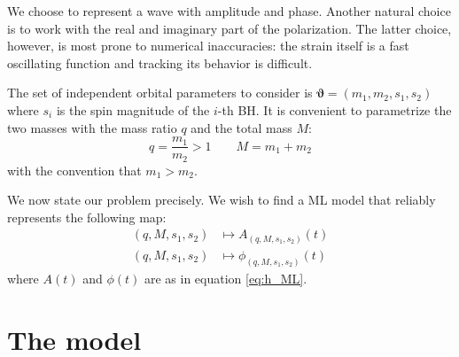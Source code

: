 \par
We choose to represent a wave with amplitude and phase. Another natural choice is to work with the real and imaginary part of the polarization. The latter choice, however, is most prone to numerical inaccuracies: the strain itself is a fast oscillating function and tracking its behavior is difficult.
\par
The set of independent orbital parameters to consider is $\boldsymbol{\vartheta} = (m_1, m_2, s_1, s_2)$ where $s_i$ is the spin magnitude of the $i$-th BH.
It is convenient to parametrize the two masses with the mass ratio $q$ and the total mass $M$:
\begin{equation} \label{eq:def_q}
	q = \frac{m_1}{m_2} >1 \qquad M=m_1+m_2
\end{equation}
with the convention that $m_1>m_2$.
\par
We now state our problem precisely. We wish to find a ML model that reliably represents the following map:
\begin{align}
	(q, M, s_1, s_2) &\longmapsto A_{(q, M, s_1, s_2)}(t) \label{eq:objective_amp}\\
	(q, M, s_1, s_2) &\longmapsto \phi_{(q, M, s_1, s_2)}(t) \label{eq:objective_ph}
\end{align}
where $A(t)$ and $\phi(t)$ are as in equation \eqref{eq:h_ML}.

\section{The model}
%
